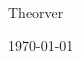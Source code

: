 \thispagestyle{empty}

~

\vspace{200pt}

\begin{center}
    {\Huge Theorver}\par
	\vspace{10pt}
    \today
\end{center}

\newpage

